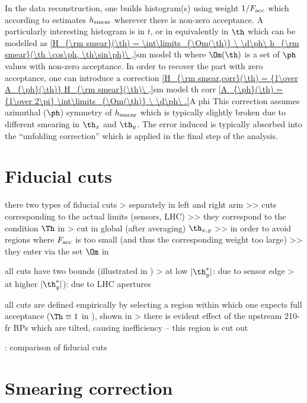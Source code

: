 In the data reconstruction, one builds histogram(s) using weight $1 / F_{\rm acc}$ which according to  estimates $h_{\rm smear}$ wherever there is non-zero acceptance. A particularly interesting histogram is in $t$, or in equivalently in $\th$ which can be modelled as
\eqref{H_{\rm smear}(\th) = \int\limits_{\Om(\th)} \ \d\ph\ h_{\rm smear}(\th \cos\ph, \th\sin\ph)\ ,}{sm model th}
where $\Om(\th)$ is a set of $\ph$ values with non-zero acceptance. In order to recover the part with zero acceptance, one can introduce a correction
\eqref{H_{\rm smear,corr}(\th) = {1\over A_{\ph}(\th)} H_{\rm smear}(\th)\ ,}{sm model th corr}
\eqref{A_{\ph}(\th) = {1\over 2\pi} \int\limits_{\Om(\th)} \ \d\ph\ .}{A phi}
This correction assumes azimuthal ($\ph$) symmetry of $h_{\rm smear}$ which is typically slightly broken due to different smearing in $\th_x$ and $\th_y$. The error induced is typically absorbed into the ``unfolding correction'' which is applied in the final step of the analysis.

\section{Fiducial cuts}

\> there two types of fiducial cuts
\>> separately in left and right arm
\>>> cuts corresponding to the actual limits (sensors, LHC)
\>>> they correspond to the condition $\Th$ in 
\>> cut in global (after averaging) $\th_{x, y}$
\>>> in order to avoid regions where $F_{\rm acc}$ is too small (and thus the corresponding weight too large)
\>>> they enter via the set $\Om$ in 

\> all cuts have two bounds (illustrated in )
\>> at low $|\th_y^*|$: due to sensor edge
\>> at higher $|\th_y^*|$): due to LHC apertures

\> all cuts are defined empirically by selecting a region within which one expects full acceptance ($\Th \equiv 1$ in ), shown in 
\>> there is evident effect of the upstream 210-fr RPs which are tilted, causing inefficiency -- this region is cut out

\> : comparison of fiducial cuts


\section{Smearing correction}

